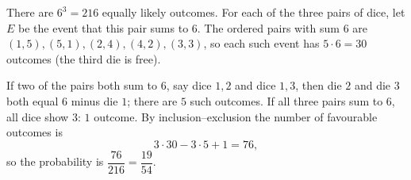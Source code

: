 There are $6^3=216$ equally likely outcomes. For each of the three pairs of dice, let $E$ be the event that this pair sums to $6$. The ordered pairs with sum $6$ are $(1,5),(5,1),(2,4),(4,2),(3,3)$, so each such event has $5\cdot6=30$ outcomes (the third die is free).

If two of the pairs both sum to $6$, say dice $1,2$ and dice $1,3$, then die $2$ and die $3$ both equal $6$ minus die $1$; there are $5$ such outcomes. If all three pairs sum to $6$, all dice show $3$: $1$ outcome. By inclusion--exclusion the number of favourable outcomes is
\[
3\cdot30-3\cdot5+1=76,
\]
so the probability is $\dfrac{76}{216}=\boxed{\dfrac{19}{54}}$.
